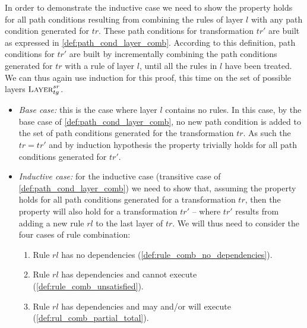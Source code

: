 \begin{ps}
In order to demonstrate the inductive case we need to show the property holds for all path conditions resulting from combining the rules of layer $l$ with any path condition generated for $tr$. These path conditions for transformation $tr'$ are built as expressed in \cref{def:path_cond_layer_comb}. According to this definition, path conditions for $tr'$ are built by incrementally combining the path conditions generated for $tr$ with a rule of layer $l$, until all the rules in $l$ have been treated. We can thus again use induction for this proof, this time on the set of possible layers $\textsc{Layer}^{sr}_{tg}$. 

\begin{itemize}
  \item \emph{Base case:} this is the case where layer $l$ contains no rules. In this case, by the base case of \cref{def:path_cond_layer_comb}, no new path condition is added to the set of path conditions generated for the transformation $tr$. As such the $tr=tr'$ and by induction hypothesis the property trivially holds for all path conditions generated for $tr'$.
  
  \item \emph{Inductive case:} for the inductive case (transitive case of \cref{def:path_cond_layer_comb}) we need to show that, assuming the property holds for all path conditions generated for a transformation $tr$, then the property will also hold for a transformation $tr'$ -- where $tr'$ results from adding a new rule $rl$ to the last layer of $tr$. We will thus need to consider the four cases of rule combination:\vspace{.2cm} 
 
\begin{enumerate}
\item\label{lab:rule_case1} Rule $rl$ has no dependencies (\cref{def:rule_comb_no_dependencies}).
\item\label{lab:rule_case2} Rule $rl$ has dependencies and cannot execute (\cref{def:rule_comb_unsatisfied}).
\item\label{lab:rule_case3} Rule $rl$ has dependencies and may and/or will execute (\cref{def:rul_comb_partial_total}).
\end{enumerate}


\end{itemize}
\end{ps}
